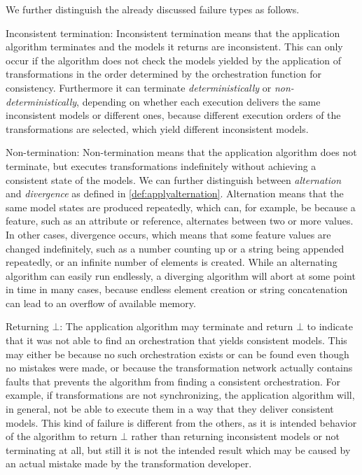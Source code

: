 We further distinguish the already discussed failure types as follows.
\begin{properdescription}
    \item[Inconsistent termination:] %
    Inconsistent termination means that the application algorithm terminates and the models it returns are inconsistent.
    This can only occur if the algorithm does not check the models yielded by the application of transformations in the order determined by the orchestration function for consistency.
    Furthermore it can terminate \emph{deterministically} or \emph{non-deterministically}, depending on whether each execution delivers the same inconsistent models or different ones, because different execution orders of the transformations are selected, which yield different inconsistent models.

    \item[Non-termination:] %
    Non-termination means that the application algorithm does not terminate, but executes transformations indefinitely without achieving a consistent state of the models.
    We can further distinguish between \emph{alternation} and \emph{divergence} as defined in \autoref{def:applyalternation}.
    Alternation means that the same model states are produced repeatedly, which can, for example, be because a feature, such as an attribute or reference, alternates between two or more values.
    In other cases, divergence occurs, which means that some feature values are changed indefinitely, such as a number counting up or a string being appended repeatedly, or an infinite number of elements is created.
    While an alternating algorithm can easily run endlessly, a diverging algorithm will abort at some point in time in many cases, because endless element creation or string concatenation can lead to an overflow of available memory.
    
    \item[Returning $\bot$:] %
    The application algorithm may terminate and return $\bot$ to indicate that it was not able to find an orchestration that yields consistent models.
    This may either be because no such orchestration exists or can be found even though no mistakes were made, or because the transformation network actually contains faults that prevents the algorithm from finding a consistent orchestration.
    For example, if transformations are not synchronizing, the application algorithm will, in general, not be able to execute them in a way that they deliver consistent models.
    This kind of failure is different from the others, as it is intended behavior of the algorithm to return $\bot$ rather than returning inconsistent models or not terminating at all, but still it is not the intended result which may be caused by an actual mistake made by the transformation developer.


\end{properdescription}
